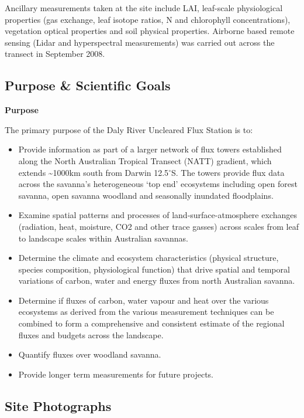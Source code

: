 \documentclass[11pt,a4paper]{article}
\begin{document}
Ancillary measurements taken at  the site include LAI, leaf-scale physiological properties (gas exchange, leaf  isotope ratios, N and chlorophyll concentrations), vegetation optical  properties and soil physical properties. Airborne based remote sensing (Lidar  and hyperspectral measurements) was carried out across the transect in  September 2008.

\subsection*{Purpose \& Scientific Goals}

\textbf{Purpose}

The  primary purpose of the Daly River Uncleared Flux Station is to:

\begin{itemize}
  \item Provide  information as part of a larger network of flux towers established along the  North Australian Tropical Transect (NATT) gradient, which extends \textasciitilde{}1000km  south from Darwin 12.5$^\circ$S.  The towers provide flux data across the savanna’s heterogeneous ‘top end’  ecosystems including open forest savanna, open savanna woodland and seasonally  inundated floodplains.
  \item Examine spatial patterns and processes of  land-surface-atmosphere exchanges (radiation, heat, moisture, CO2 and other  trace gasses) across scales from leaf to landscape scales within Australian  savannas.
  \item Determine  the climate and ecosystem characteristics (physical structure,  species composition, physiological function) that drive spatial and temporal variations of  carbon, water and energy fluxes from north Australian savanna.
  \item Determine if fluxes of carbon, water vapour and  heat over the various ecosystems as derived from the various measurement  techniques can be combined to form a comprehensive and consistent estimate of  the regional fluxes and budgets across the landscape.
  \item Quantify  fluxes over woodland savanna.
  \item Provide  longer term measurements for future projects.
\end{itemize}

\subsection*{Site Photographs}
\end{document}
